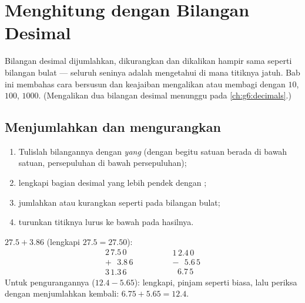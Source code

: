 \chapter{Menghitung dengan Bilangan Desimal}\label{ch:g5:decimalops}

Bilangan desimal dijumlahkan, dikurangkan dan dikalikan hampir sama
seperti bilangan bulat --- seluruh seninya adalah mengetahui di mana
titiknya jatuh. Bab ini membahas cara bersusun dan keajaiban
mengalikan atau membagi dengan $10$, $100$, $1000$. (Mengalikan dua
bilangan desimal menunggu pada \cref{ch:g6:decimals}.)

\section{Menjumlahkan dan mengurangkan}

\begin{method}\label{met:g5:decimalops:addsub}
\begin{enumerate}
  \item Tulislah bilangannya dengan \emph{ yang
        } (dengan begitu satuan berada di bawah satuan,
        persepuluhan di bawah persepuluhan);
  \item lengkapi bagian desimal yang lebih pendek dengan ;
  \item jumlahkan atau kurangkan seperti pada bilangan bulat;
  \item turunkan titiknya lurus ke bawah pada hasilnya.
\end{enumerate}
\end{method}

\begin{example}\label{ex:g5:decimalops:addsub}
$27.5 + 3.86$ (lengkapi $27.5 = 27.50$):
\[
\begin{array}{r}
2\,7.5\,0 \\
+\ \ \ 3.8\,6 \\
\hline
3\,1.3\,6
\end{array}
\qquad\qquad
\begin{array}{r}
1\,2.4\,0 \\
-\ \ \ 5.6\,5 \\
\hline
\ \ \,6.7\,5
\end{array}
\]
Untuk pengurangannya ($12.4 - 5.65$): lengkapi, pinjam seperti
biasa, lalu periksa dengan menjumlahkan kembali: $6.75 + 5.65 = 12.4$.
\end{example}

